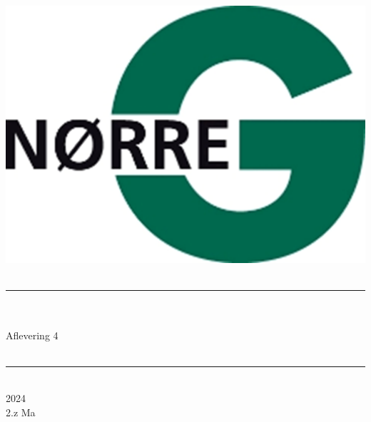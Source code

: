 \documentclass[12pt,x11names,a4paper]{article}
\begin{document}
%

\begin{titlepage}

\begin{minipage}{0.27\textwidth}

\end{minipage}
\begin{minipage}{0.73\textwidth}
\begin{center}
\phantom{h} \vspace{1cm}\\
\hspace{4cm}
\includegraphics[scale = 1]{Billeder/Norreg.png} \\
\phantom{h} \vspace{5cm}\\
\rule{0.7\textwidth}{0.3mm}\\
\phantom{h}\\
{\fontsize{50}{60}\selectfont Aflevering 4}\\
\phantom{h}\\
\rule{0.7\textwidth}{0.3mm}\\
\Large 2024\\
\Large 2.z Ma

\end{center}
\end{minipage}
\end{titlepage}
\end{document}
